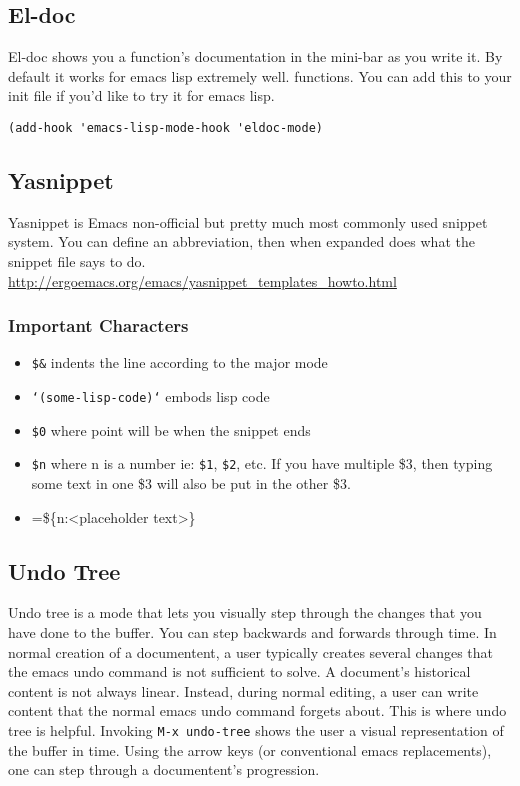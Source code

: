 \documentclass[11pt]{article}
\begin{document}
\subsection{El-doc}
\label{sec:orgheadline24}
El-doc shows you a function's documentation in the mini-bar as you write it.  By default it works for emacs lisp extremely well.  functions.  You can add this to your init file if you'd like to try it for emacs lisp.
\begin{verbatim}
(add-hook 'emacs-lisp-mode-hook 'eldoc-mode)
\end{verbatim}

\subsection{Yasnippet}
\label{sec:orgheadline26}
Yasnippet is Emacs non-official but pretty much most commonly used snippet system.  You can define an abbreviation, then when expanded does what the snippet file says to do.
\url{http://ergoemacs.org/emacs/yasnippet_templates_howto.html}

\subsubsection{Important Characters}
\label{sec:orgheadline25}
\begin{itemize}
\item \texttt{\$\&} indents the line according to the major mode
\item \texttt{`(some-lisp-code)`} embods lisp code
\item \texttt{\$0} where point will be when the snippet ends
\item \texttt{\$n} where n is a number ie: \texttt{\$1}, \texttt{\$2}, etc.  If you have multiple \$3, then typing some text in one \$3 will also be put in
the other \$3.
\item =\$\{n:<placeholder text>\}
\end{itemize}
\subsection{Undo Tree}
\label{sec:orgheadline27}
Undo tree is a mode that lets you visually step through the changes that you have done to the buffer.  You can step backwards and forwards through time.  In normal creation of a documentent, a user typically creates several changes that the emacs undo command is not sufficient to solve.  A document's historical content is not always linear.  Instead, during normal editing, a user can write content that the normal emacs undo command forgets about.  This is where undo tree is helpful.  Invoking \texttt{M-x undo-tree} shows the user a visual representation of the buffer in time.  Using the arrow keys (or conventional emacs replacements), one can step through a documentent's progression.
\end{document}
